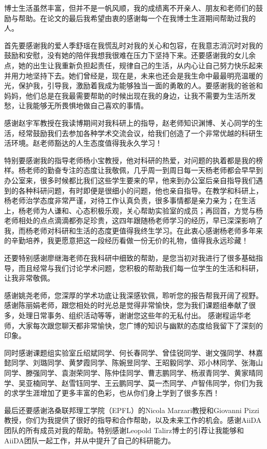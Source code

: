 \documentclass[phd,nobackinfo]{scutthesis}
\begin{document}
\begin{acknowledgement}
  博士生活虽然丰富，但并不是一帆风顺，我的成绩离不开亲人、朋友和老师们的鼓励与帮助。在论文的最后我希望由衷的感谢每一个在我博士生涯期间帮助过我的人。

  首先要感谢我的爱人季舒瑶在我慌乱时对我的关心和包容，在我意志消沉时对我的鼓励和安慰，没有她的陪伴我想我很难在压力下坚持下来。还要感谢我的女儿余点，她的出生让我重新负担起责任，规律自己的生活，从内心让自己努力快乐起来并用力地坚持下去。她们曾经是，现在是，未来也还会是我生命中最最明亮温暖的光，保护我，引导我，激励着我成为能够独当一面的勇敢的人。要感谢我的爸爸和妈妈，他们总是在我最需要帮助的时候出现在我的身边，让我不需要为生活所发愁，让我能够无所畏惧地做自己喜欢的事情。

  感谢赵宇军教授在我读博期间对我科研上的指导，赵老师知识渊博、关心同学的生活，经常鼓励我们去参加各种学术交流会议，给我们创造了一个非常优越的科研生活环境。赵老师豁达的人生态度值得我永久学习！

  特别要感谢我的指导老师杨小宝教授，他对科研的热爱，对问题的执着都是我的榜样。杨老师的勤奋专注的态度让我敬佩，几乎周一到周日每一天杨老师都会早早到办公室来，很多时候都比我们这些学生要来的早，他来到办公室后亲自指导我们遇到的各种科研问题，有时即便是很细小的问题，他也亲自指导。在教学和科研上，杨老师治学态度非常严谨，对待工作认真负责，很多事情都是亲力亲为；在生活上，杨老师为人谦和、心态积极乐观，关心帮助实验室的成员；再回首，方觉与杨老师相处的点点滴滴都弥足珍贵，这四年跟随杨老师学习的经历，早已深深影响了我，而杨老师对科研和生活的态度更值得我终生学习。在此衷心感谢杨老师多年来的辛勤培养，我更愿意把这一段经历看做一份无价的礼物，值得我永远珍藏！

  还要特别感谢廖继海老师在我科研中细致的帮助，是您当初对我进行了很多基础指导，而且经常与我们讨论学术问题，您积极的帮助我们每一位学生的生活和科研，让我非常敬佩。

  感谢姚尧老师，您深厚的学术功底让我深感钦佩，聆听您的报告帮我开阔了视野。
  感谢陈丽娟老师，跟您相处的时光总是觉得非常愉快，您为我们课题组奉献了很多，处理日常事务、组织活动等等，谢谢您这些年的无私付出。
  感谢程运华老师，大家每次跟您聊天都非常愉快，您广博的知识与幽默的态度给我留下了深刻的印象。

  同时感谢课题组实验室丘绍斌同学、何长春同学、曾佳锐同学、谢文强同学、林嘉懿同学、刘璐同学、黄梦霞同学、陈婉昱同学、王昭毅同学、邓小林同学、张海山同学、滕强同学、袁澍荣同学、陈仲佳同学、曹志鹏同学、杨淑青同学、黄家晴同学、吴亚楠同学、赵雪钰同学、王云鹏同学、莫一杰同学、卢智伟同学，你们为我的求学生涯增加了更多丰富的色彩，也从你们身上学到了很多东西！

  最后还要感谢洛桑联邦理工学院（EPFL）的Nicola Marzari教授和Giovanni Pizzi教授，你们为我提供了很好的指导和合作帮助，以及未来工作的机会。感谢AiiDA团队的所有成员对我的帮助。特别感谢Leopold Talirz博士的引荐让我能够和AiiDA团队一起工作，并从中提升了自己的科研能力。

\end{acknowledgement}
\end{document}
